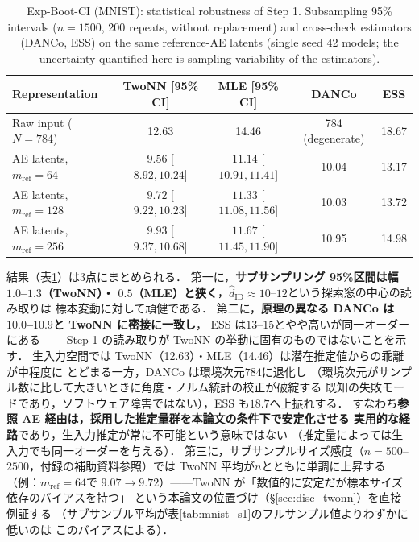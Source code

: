 \documentclass[11pt,a4paper]{jsarticle}
\newcommand{\hatdID}{\hat{d}_{\mathrm{ID}}}
\begin{document}
\begin{table}[H]
\centering
\caption{Exp-Boot-CI (MNIST): statistical robustness of Step 1.
Subsampling 95\% intervals ($n = 1500$, 200 repeats, without replacement)
and cross-check estimators (DANCo, ESS) on the same reference-AE latents
(single seed 42 models; the uncertainty quantified here is sampling
variability of the estimators).}
\label{tab:boot_ci}
\small
\begin{tabular}{lcccc}
\toprule
Representation & TwoNN [95\% CI] & MLE [95\% CI] & DANCo & ESS \\
\midrule
Raw input ($N = 784$) & 12.63 & 14.46 & 784 (degenerate) & 18.67 \\
\midrule
AE latents, $m_{\mathrm{ref}} = 64$  & $9.56$ [$8.92, 10.24$] & $11.14$ [$10.91, 11.41$] & 10.04 & 13.17 \\
AE latents, $m_{\mathrm{ref}} = 128$ & $9.72$ [$9.22, 10.23$] & $11.33$ [$11.08, 11.56$] & 10.03 & 13.72 \\
AE latents, $m_{\mathrm{ref}} = 256$ & $9.93$ [$9.37, 10.68$] & $11.67$ [$11.45, 11.90$] & 10.95 & 14.98 \\
\bottomrule
\end{tabular}
\end{table}

結果（表\ref{tab:boot_ci}）は3点にまとめられる．
第一に，\textbf{サブサンプリング 95\%区間は幅$1.0$--$1.3$（TwoNN）・
$0.5$（MLE）と狭く}，$\hatdID \approx 10$--$12$という探索窓の中心の読み取りは
標本変動に対して頑健である．
第二に，\textbf{原理の異なる DANCo は$10.0$--$10.9$と TwoNN に密接に一致し}，
ESS は$13$--$15$とやや高いが同一オーダーにある——
Step 1 の読み取りが TwoNN の挙動に固有のものではないことを示す．
生入力空間では TwoNN（12.63）・MLE（14.46）は潜在推定値からの乖離が中程度に
とどまる一方，DANCo は環境次元$784$に退化し
（環境次元がサンプル数に比して大きいときに角度・ノルム統計の校正が破綻する
既知の失敗モードであり，ソフトウェア障害ではない），ESS も$18.7$へ上振れする．
すなわち\textbf{参照 AE 経由は，採用した推定量群を本論文の条件下で安定化させる
実用的な経路}であり，生入力推定が常に不可能という意味ではない
（推定量によっては生入力でも同一オーダーを与える）．
第三に，サブサンプルサイズ感度（$n = 500$--$2500$，付録の補助資料参照）では
TwoNN 平均が$n$とともに単調に上昇する（例：$m_{\mathrm{ref}} = 64$で
$9.07 \to 9.72$）——TwoNN が「数値的に安定だが標本サイズ依存のバイアスを持つ」
という本論文の位置づけ（§\ref{sec:disc_twonn}）を直接例証する
（サブサンプル平均が表\ref{tab:mnist_s1}のフルサンプル値よりわずかに低いのは
このバイアスによる）．
\end{document}
